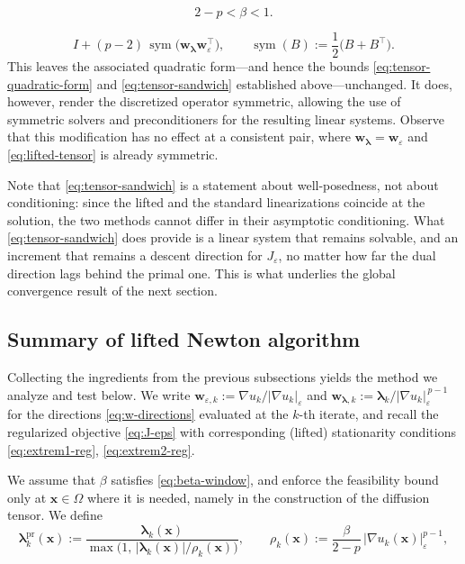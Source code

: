 \documentclass[10pt,a4paper]{amsart}
\newcommand{\bs}[1]{\ensuremath{\boldsymbol{#1}}}
\DeclareMathOperator{\sym}{sym}
\begin{document}
\begin{equation}\label{eq:beta-window}
  2-p<\beta<1.
\end{equation}

\begin{equation}\label{eq:lifted-tensor-sym}
  I + (p-2)\,\sym\bigl(\bs w_{\bs\lambda}\bs w_\varepsilon^\top\bigr),
  \qquad \sym(B):=\frac12\bigl(B+B^\top\bigr).
\end{equation}
This leaves the associated quadratic form---and hence the bounds \eqref{eq:tensor-quadratic-form} and \eqref{eq:tensor-sandwich} established above---unchanged. It does, however, render the discretized operator symmetric, allowing the use of symmetric solvers and preconditioners for the resulting linear systems. Observe that this modification has no effect at a consistent pair, where $\bs w_{\bs\lambda}=\bs w_\varepsilon$ and \eqref{eq:lifted-tensor} is already symmetric.

Note that \eqref{eq:tensor-sandwich} is a statement about well-posedness, not about conditioning: since the lifted and the standard linearizations coincide at the solution, the two methods cannot differ in their asymptotic conditioning. What \eqref{eq:tensor-sandwich} does provide is a linear system that remains solvable, and an increment that remains a descent direction for $J_\varepsilon$, no matter how far the dual direction lags behind the primal one. This is what underlies the global convergence result of the next section.


\subsection{Summary of lifted Newton algorithm}
\label{ssec:lifted-algorithm}
Collecting the ingredients from the previous subsections yields the method we analyze and test below. We write
$\bs w_{\varepsilon,k}:=\nabla u_k/|\nabla u_k|_\varepsilon$ and
$\bs w_{\bs\lambda,k}:=\bs\lambda_k/|\nabla u_k|_\varepsilon^{\,p-1}$
for the directions \eqref{eq:w-directions} evaluated at the $k$-th iterate, and recall the regularized objective \eqref{eq:J-eps} with corresponding (lifted) stationarity conditions \eqref{eq:extrem1-reg}, \eqref{eq:extrem2-reg}.

We assume that $\beta$ satisfies \eqref{eq:beta-window}, and enforce the feasibility bound only at $\bs x\in\Omega$ where it is needed, namely in the construction of the diffusion tensor. We define
\begin{equation}\label{eq:discrete-lambda-projection}
  \bs\lambda_k^{\mathrm{pr}}(\bs x):=\frac{\bs\lambda_k(\bs x)}{\max\bigl(1,\,|\bs\lambda_k(\bs x)|/\rho_k(\bs x)\bigr)},
  \qquad \rho_k(\bs x):=\frac{\beta}{2-p}\,|\nabla u_k(\bs x)|_\varepsilon^{p-1},
\end{equation}
\end{document}
